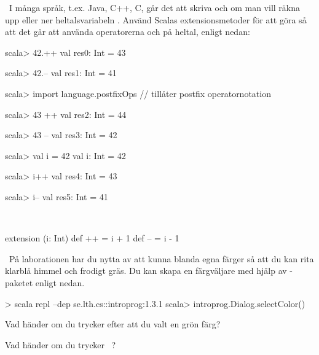 \QUESTEND



\QUESTBEGIN

\Task \what~I många språk, t.ex. Java, C++, C, går det att skriva  och  om man vill räkna upp eller ner heltalsvariabeln . Använd Scalas extensionsmetoder för att göra så att det går att använda operatorerna \code{++} och \code{--} på heltal, enligt nedan:
\begin{REPLnonum}
scala> 42.++
val res0: Int = 43

scala> 42.--
val res1: Int = 41

scala> import language.postfixOps    // tillåter postfix operatornotation

scala> 43 ++
val res2: Int = 44

scala> 43 --
val res3: Int = 42

scala> val i = 42
val i: Int = 42

scala> i++
val res4: Int = 43

scala> i--
val res5: Int = 41
\end{REPLnonum}

\SOLUTION

\TaskSolved \what~

\begin{Code}
extension (i: Int)
  def ++ = i + 1
  def -- = i - 1
\end{Code}


\QUESTEND





\QUESTBEGIN

\Task \what~På laborationen har du nytta av att kunna blanda egna färger så att du kan rita klarblå himmel och frodigt gräs. Du kan skapa en färgväljare med hjälp av -paketet enligt nedan.
\begin{REPL}
> scala repl --dep se.lth.cs::introprog:1.3.1
scala> introprog.Dialog.selectColor()
\end{REPL}

\Subtask Vad händer om du trycker  efter att du valt en grön färg?

\Subtask Vad händer om du trycker ~?


